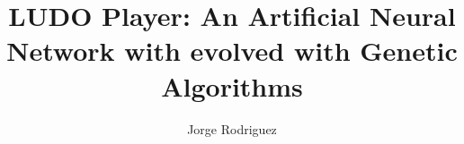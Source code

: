 \title{LUDO Player: An Artificial Neural Network with evolved with Genetic Algorithms}
\author{Jorge Rodriguez}
\maketitle